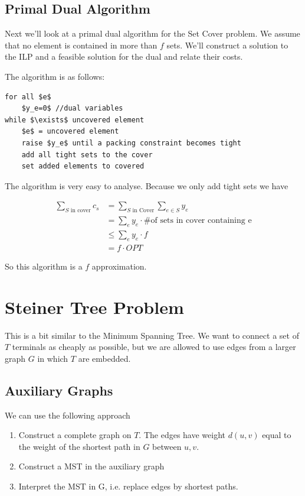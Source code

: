 \subsection{Primal Dual Algorithm}

Next we'll look at a primal dual algorithm for the Set Cover problem. We assume that no element is contained in more than $f$ sets. We'll construct a solution to the ILP and a feasible solution for the dual and relate their costs.

The algorithm is as follows:

\begin{lstlisting}
for all $e$
	$y_e=0$ //dual variables
while $\exists$ uncovered element
	$e$ = uncovered element
	raise $y_e$ until a packing constraint becomes tight
	add all tight sets to the cover
	set added elements to covered
\end{lstlisting}

The algorithm is very easy to analyse. Because we only add tight sets we have

\begin{align*}
\sum_{S \text{ in cover}} c_s  &= \sum_{S \text{ in Cover}} \sum_{e\in S} y_e\\
	&=\sum_{e} y_e \cdot \text{\# of sets in cover containing e}\\
	&\leq \sum_{e} y_e \cdot f\\
	&= f\cdot OPT
\end{align*}

So this algorithm is a $f$ approximation.

\section{Steiner Tree Problem}

This is a bit similar to the Minimum Spanning Tree. We want to connect a set of $T$ terminals as cheaply as possible, but we are allowed to use edges from a larger graph $G$ in which $T$ are embedded.

\subsection{Auxiliary Graphs}

We can use the following approach

\begin{enumerate}
\item Construct a complete graph on $T$. The edges have weight $d(u,v)$ equal to the weight of the shortest path in $G$ between $u,v$.
\item Construct a MST in the auxiliary graph
\item Interpret the MST in G, i.e. replace edges by shortest paths.
\end{enumerate}

